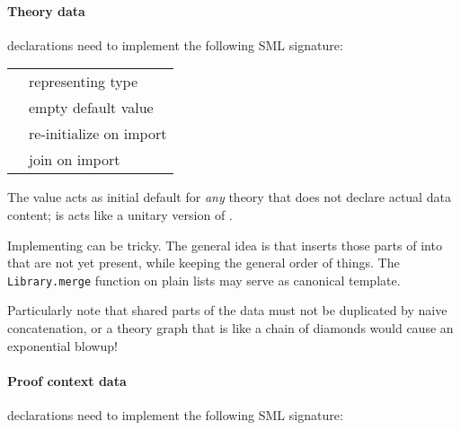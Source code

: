 \begin{isabellebody}
\begin{isamarkuptext}
  \paragraph{Theory data} declarations need to implement the following
  SML signature:

  \medskip
  \begin{tabular}{ll}
  \isa{{\isaliteral{5C3C747970653E}{\isasymtype}}\ T} & representing type \\
  \isa{{\isaliteral{5C3C76616C3E}{\isasymval}}\ empty{\isaliteral{3A}{\isacharcolon}}\ T} & empty default value \\
  \isa{{\isaliteral{5C3C76616C3E}{\isasymval}}\ extend{\isaliteral{3A}{\isacharcolon}}\ T\ {\isaliteral{5C3C72696768746172726F773E}{\isasymrightarrow}}\ T} & re-initialize on import \\
  \isa{{\isaliteral{5C3C76616C3E}{\isasymval}}\ merge{\isaliteral{3A}{\isacharcolon}}\ T\ {\isaliteral{5C3C74696D65733E}{\isasymtimes}}\ T\ {\isaliteral{5C3C72696768746172726F773E}{\isasymrightarrow}}\ T} & join on import \\
  \end{tabular}
  \medskip

  The  value acts as initial default for \emph{any}
  theory that does not declare actual data content; 
  is acts like a unitary version of .

  Implementing  can be tricky.  The general idea is
  that  inserts those parts of  into  that are not yet present, while
  keeping the general order of things.  The \verb|Library.merge|
  function on plain lists may serve as canonical template.

  Particularly note that shared parts of the data must not be
  duplicated by naive concatenation, or a theory graph that is like a
  chain of diamonds would cause an exponential blowup!

  \paragraph{Proof context data} declarations need to implement the
  following SML signature:


\end{isamarkuptext}
\end{isabellebody}
